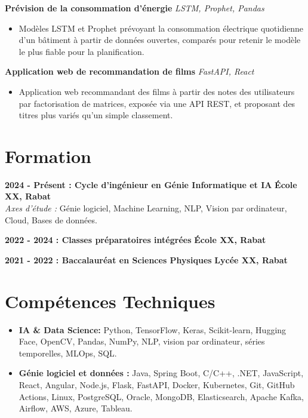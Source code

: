\documentclass[11pt,a4paper]{extarticle}
\let\oldtextbf\textbf
\renewcommand{\textbf}[1]{\textcolor{primary}{\oldtextbf{#1}}}
\begin{document}
\vspace{1pt}

\textbf{Prévision de la consommation d'énergie} \hfill \textit{LSTM, Prophet, Pandas}
\begin{itemize}
\item Modèles LSTM et Prophet prévoyant la consommation électrique quotidienne d'un bâtiment à partir de données ouvertes, comparés pour retenir le modèle le plus fiable pour la planification.
\end{itemize}

\vspace{1pt}

\textbf{Application web de recommandation de films} \hfill \textit{FastAPI, React}
\begin{itemize}
\item Application web recommandant des films à partir des notes des utilisateurs par factorisation de matrices, exposée via une API REST, et proposant des titres plus variés qu'un simple classement.
\end{itemize}

\section*{Formation}

\textbf{2024 - Présent : Cycle d'ingénieur en Génie Informatique et IA} \hfill \textbf{École XX, Rabat} \\
\textit{Axes d'étude :} Génie logiciel, Machine Learning, NLP, Vision par ordinateur, Cloud, Bases de données.

\vspace{1pt}

\textbf{2022 - 2024 : Classes préparatoires intégrées} \hfill \textbf{École XX, Rabat}

\vspace{1pt}

\textbf{2021 - 2022 : Baccalauréat en Sciences Physiques} \hfill \textbf{Lycée XX, Rabat}

\section*{Compétences Techniques}
\begin{itemize}
    \item \textbf{IA \& Data Science:} Python, TensorFlow, Keras, Scikit-learn, Hugging Face, OpenCV, Pandas, NumPy, NLP, vision par ordinateur, séries temporelles, MLOps, SQL.
    \item \textbf{Génie logiciel et données :} Java, Spring Boot, C/C++, .NET, JavaScript, React, Angular, Node.js, Flask, FastAPI, Docker, Kubernetes, Git, GitHub Actions, Linux, PostgreSQL, Oracle, MongoDB, Elasticsearch, Apache Kafka, Airflow, AWS, Azure, Tableau.
\end{itemize}
\end{document}
